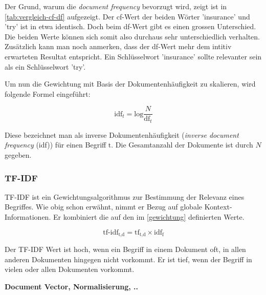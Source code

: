 Der Grund, warum die \textit{document frequency} bevorzugt wird, zeigt ist in \autoref{tab:vergleich-cf-df} aufgezeigt. Der cf-Wert der beiden Wörter 'insurance' und 'try' ist in etwa identisch. Doch beim df-Wert gibt es einen grossen Unterschied. Die beiden Werte können sich somit also durchaus sehr unterschiedlich verhalten. Zusätzlich kann man noch anmerken, dass der df-Wert mehr dem intitiv erwarteten Resultat entspricht. Ein Schlüsselwort 'insurance' sollte relevanter sein als ein Schlüsselwort 'try'.

Um nun die Gewichtung mit Basis der Dokumentenhäufigkeit zu skalieren, wird folgende Formel eingeführt:

\[
\text{idf}_{t}=\text{log}\frac{N}{\text{df}_{t}}
\]

Diese bezeichnet man als inverse Dokumentenhäufigkeit (\textit{inverse document frequency} (idf)) für einen Begriff $\text{t}$. Die Gesamtanzahl der Dokumente ist durch $N$ gegeben.
\\\cite{manning2008introduction}

\subsubsection{TF-IDF}

TF-IDF ist ein Gewichtungsalgorithmus zur Bestimmung der Relevanz eines Begriffes. Wie obig schon erwähnt, nimmt er Bezug auf globale Kontext-Informationen. Er kombiniert die auf den im \autoref{gewichtung} definierten Werte.

\[
    \text{tf-idf}_{\text{t,d}} = \text{tf}_{\text{t,d}}\times\text{idf}_\text{f}
\]

Der TF-IDF Wert ist hoch, wenn ein Begriff in einem Dokument oft, in allen anderen Dokumenten hingegen nicht vorkommt. Er ist tief, wenn der Begriff in vielen oder allen Dokumenten vorkommt.


\textbf{Document Vector, Normalisierung, ..}

\cite{manning2008introduction}




